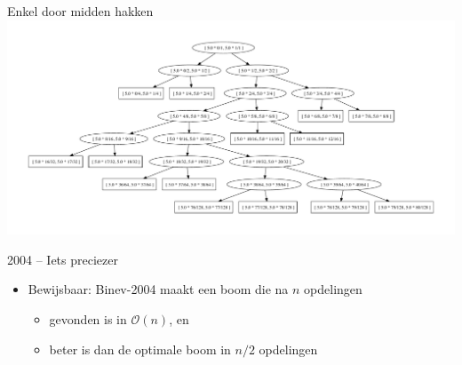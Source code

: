 \documentclass{beamer}
\begin{document}
\begin{frame}{Enkel door midden hakken}
{  \includegraphics[height=0.5\textheight]{tree_7.pdf}}
\end{frame}

\begin{frame}{2004 -- Iets preciezer}
  \begin{itemize}
    \item Bewijsbaar: Binev-2004 maakt een boom die na $n$ opdelingen
      \begin{itemize}
        \item gevonden is in $\mathcal{O}(n)$, en
        \item beter is dan de optimale boom in $n/2$ opdelingen
      \end{itemize}
  \end{itemize}
\end{frame}
\end{document}
